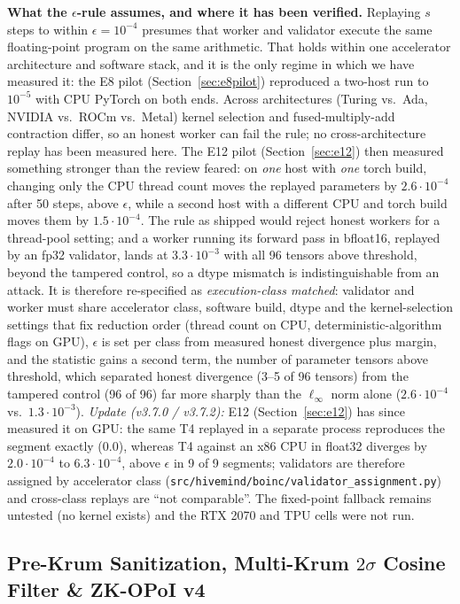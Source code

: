 \documentclass[11pt,a4paper]{article}
\begin{document}
\textbf{What the $\epsilon$-rule assumes, and where it has been verified.} Replaying $s$ steps to within $\epsilon = 10^{-4}$ presumes that worker and validator execute the same floating-point program on the same arithmetic. That holds within one accelerator architecture and software stack, and it is the only regime in which we have measured it: the E8 pilot (Section~\ref{sec:e8pilot}) reproduced a two-host run to $10^{-5}$ with CPU PyTorch on both ends. Across architectures (Turing vs.\ Ada, NVIDIA vs.\ ROCm vs.\ Metal) kernel selection and fused-multiply-add contraction differ, so an honest worker can fail the rule; no cross-architecture replay has been measured here. The E12 pilot (Section~\ref{sec:e12}) then measured something stronger than the review feared: on \emph{one} host with \emph{one} torch build, changing only the CPU thread count moves the replayed parameters by $2.6\cdot 10^{-4}$ after 50 steps, above $\epsilon$, while a second host with a different CPU and torch build moves them by $1.5\cdot 10^{-4}$. The rule as shipped would reject honest workers for a thread-pool setting; and a worker running its forward pass in bfloat16, replayed by an fp32 validator, lands at $3.3\cdot 10^{-3}$ with all 96 tensors above threshold, beyond the tampered control, so a dtype mismatch is indistinguishable from an attack. It is therefore re-specified as \emph{execution-class matched}: validator and worker must share accelerator class, software build, dtype and the kernel-selection settings that fix reduction order (thread count on CPU, deterministic-algorithm flags on GPU), $\epsilon$ is set per class from measured honest divergence plus margin, and the statistic gains a second term, the number of parameter tensors above threshold, which separated honest divergence (3--5 of 96 tensors) from the tampered control (96 of 96) far more sharply than the $\ell_\infty$ norm alone ($2.6\cdot 10^{-4}$ vs.\ $1.3\cdot 10^{-3}$). \emph{Update (v3.7.0 / v3.7.2):} E12 (Section~\ref{sec:e12}) has since measured it on GPU: the same T4 replayed in a separate process reproduces the segment exactly ($0.0$), whereas T4 against an x86 CPU in float32 diverges by $2.0\cdot10^{-4}$ to $6.3\cdot10^{-4}$, above $\epsilon$ in 9 of 9 segments; validators are therefore assigned by accelerator class (\texttt{src/hivemind/boinc/validator\_assignment.py}) and cross-class replays are ``not comparable''. The fixed-point fallback remains untested (no kernel exists) and the RTX 2070 and TPU cells were not run.

\subsection{Pre-Krum Sanitization, Multi-Krum $2\sigma$ Cosine Filter \& ZK-OPoI v4}
\end{document}
